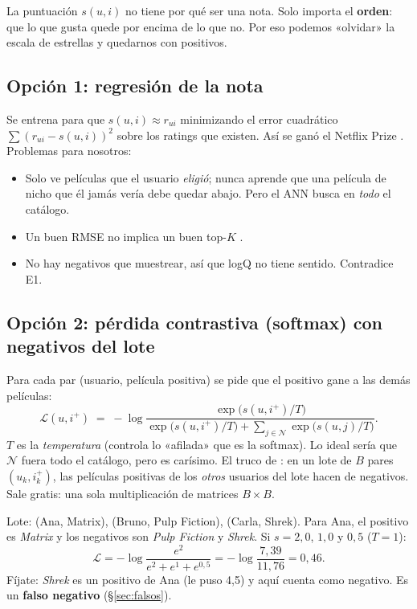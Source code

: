 \documentclass[a4paper,11pt]{article}
\begin{document}
\begin{idea}
La puntuación $s(u,i)$ no tiene por qué ser una nota. Solo importa el \textbf{orden}: que lo que gusta quede por
encima de lo que no. Por eso podemos «olvidar» la escala de estrellas y quedarnos con positivos.
\end{idea}

\subsection{Opción 1: regresión de la nota}
Se entrena para que $s(u,i)\approx r_{ui}$ minimizando el error cuadrático $\sum (r_{ui}-s(u,i))^2$ sobre los ratings que
existen. Así se ganó el Netflix Prize \cite{koren2009}. Problemas para nosotros:
\begin{itemize}
  \item Solo ve películas que el usuario \emph{eligió}; nunca aprende que una película de nicho que él jamás vería debe
        quedar abajo. Pero el ANN busca en \emph{todo} el catálogo.
  \item Un buen RMSE no implica un buen top-$K$ \cite{cremonesi2010}.
  \item No hay negativos que muestrear, así que logQ no tiene sentido. Contradice E1.
\end{itemize}

\subsection{Opción 2: pérdida contrastiva (softmax) con negativos del lote}
Para cada par (usuario, película positiva) se pide que el positivo gane a las demás películas:
\[
\mathcal{L}(u,i^+) \;=\; -\log \frac{\exp\big(s(u,i^+)/T\big)}{\exp\big(s(u,i^+)/T\big)+\sum_{j\in\mathcal{N}}\exp\big(s(u,j)/T\big)} .
\]
$T$ es la \emph{temperatura} (controla lo «afilada» que es la softmax). Lo ideal sería que $\mathcal{N}$ fuera todo el catálogo,
pero es carísimo. El truco de \cite{yi2019}: en un lote de $B$ pares $(u_k,i_k^+)$, las películas positivas de los
\emph{otros} usuarios del lote hacen de negativos. Sale gratis: una sola multiplicación de matrices $B\times B$.

\begin{ejemplo}
Lote: (Ana, Matrix), (Bruno, Pulp Fiction), (Carla, Shrek). Para Ana, el positivo es \emph{Matrix} y los negativos son
\emph{Pulp Fiction} y \emph{Shrek}. Si $s=2{,}0$, $1{,}0$ y $0{,}5$ ($T=1$):
\[
\mathcal{L}=-\log\frac{e^{2}}{e^{2}+e^{1}+e^{0{,}5}}=-\log\frac{7{,}39}{11{,}76}=0{,}46 .
\]
Fíjate: \emph{Shrek} es un positivo de Ana (le puso 4,5) y aquí cuenta como negativo. Es un \textbf{falso negativo}
(\S\ref{sec:falsos}).
\end{ejemplo}
\end{document}
